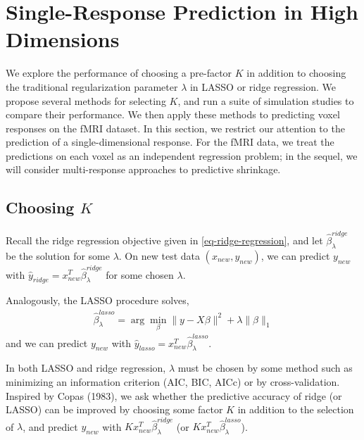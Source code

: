 \documentclass[main]{subfiles}
\begin{document}
\section{Single-Response Prediction in High Dimensions}
\label{sec-single_repsonse}
We explore the performance of choosing a pre-factor $K$ in addition to choosing the
traditional regularization parameter $\lambda$ in LASSO or ridge regression. We propose several methods for
selecting $K$, and
run a suite of simulation studies to compare their performance.
We then apply these methods to predicting voxel responses on the
fMRI dataset. In this section, we restrict our attention to the prediction of a single-dimensional response.
For the fMRI data, we treat the predictions on each voxel as an independent
regression problem; in the sequel, we will consider multi-response approaches to predictive shrinkage.

\subsection{Choosing $K$}
Recall the ridge regression objective given in \eqref{eq-ridge-regression}, and let $\hat\beta^{ridge}_\lambda$ be
the solution for some $\lambda$. On new test data $(x_{new}, y_{new})$,
we can predict $y_{new}$ with $\hat y_{ridge} = x_{new}^T \hat\beta^{ridge}_\lambda$ for some
chosen $\lambda$.

Analogously, the LASSO procedure solves,
\begin{align}
	\hat\beta^{lasso}_\lambda = \arg\min_{\beta} \|y - X\beta\|^2 + \lambda \|\beta\|_1
\end{align}
and we can predict $y_{new}$ with $\hat y_{lasso} = x_{new}^T \hat\beta^{lasso}_\lambda$.

In both LASSO and ridge regression, $\lambda$ must be chosen by some method such as minimizing an information
criterion (AIC, BIC, AICc) or by cross-validation. Inspired by Copas (1983), we ask whether the predictive
accuracy of ridge (or LASSO) can be improved by choosing some factor $K$ in addition to the selection of $\lambda$,
and predict
$y_{new}$ with $K x_{new}^T \hat\beta^{ridge}_\lambda $ (or $K x_{new}^T\hat\beta^{lasso}_\lambda$).
\end{document}

